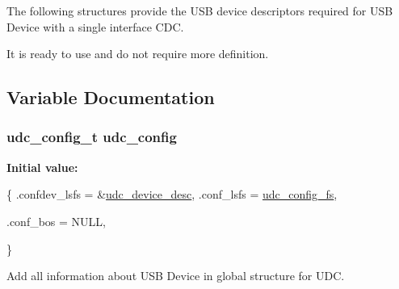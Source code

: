 The following structures provide the U\-S\-B device descriptors required for U\-S\-B Device with a single interface C\-D\-C.

It is ready to use and do not require more definition. 

\subsection{Variable Documentation}
\hypertarget{group__udi__cdc__group__single__desc_ga40ae5a61fbfa7e289136b2f9fd190217}{
\subsubsection[{udc\-\_\-config}]{ {\bf udc\-\_\-config\-\_\-t} udc\-\_\-config}}\label{group__udi__cdc__group__single__desc_ga40ae5a61fbfa7e289136b2f9fd190217}
{\bfseries Initial value\-:}
\begin{DoxyCode}
 \{
        .confdev\_lsfs = &\hyperlink{group__udi__cdc__group__single__desc_ga9b0e293c7d3236bf90c42d808c2bc1ab}{udc\_device\_desc},
        .conf\_lsfs = \hyperlink{group__udi__cdc__group__single__desc_ga5db6d631eea81d0c57ac6fde3a4963a1}{udc\_config\_fs},








        .conf\_bos = NULL,

\}
\end{DoxyCode}


Add all information about U\-S\-B Device in global structure for U\-D\-C. 

